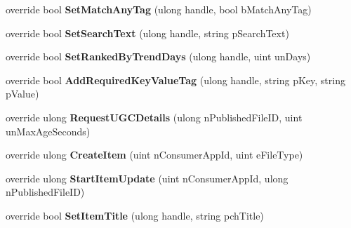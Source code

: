 \begin{DoxyCompactItemize}
override bool {\bfseries Set\+Match\+Any\+Tag} (ulong handle, bool b\+Match\+Any\+Tag)
\item 
\mbox{\label{class_valve_1_1_steamworks_1_1_c_steam_u_g_c_a9e24742b117a556da4d339145d34fea7}} 
override bool {\bfseries Set\+Search\+Text} (ulong handle, string p\+Search\+Text)
\item 
\mbox{\label{class_valve_1_1_steamworks_1_1_c_steam_u_g_c_ae2de4b6798d2b635130b4092e193e91d}} 
override bool {\bfseries Set\+Ranked\+By\+Trend\+Days} (ulong handle, uint un\+Days)
\item 
\mbox{\label{class_valve_1_1_steamworks_1_1_c_steam_u_g_c_ab264e7b336dd432c50d051a054842634}} 
override bool {\bfseries Add\+Required\+Key\+Value\+Tag} (ulong handle, string p\+Key, string p\+Value)
\item 
\mbox{\label{class_valve_1_1_steamworks_1_1_c_steam_u_g_c_a82c63eea1468dc5e8d970244c31c9d2f}} 
override ulong {\bfseries Request\+U\+G\+C\+Details} (ulong n\+Published\+File\+ID, uint un\+Max\+Age\+Seconds)
\item 
\mbox{\label{class_valve_1_1_steamworks_1_1_c_steam_u_g_c_aad823d6de978f22cc6b99c82e01c3b88}} 
override ulong {\bfseries Create\+Item} (uint n\+Consumer\+App\+Id, uint e\+File\+Type)
\item 
\mbox{\label{class_valve_1_1_steamworks_1_1_c_steam_u_g_c_ab68ae06424a0f5e4f562e7a072110d2f}} 
override ulong {\bfseries Start\+Item\+Update} (uint n\+Consumer\+App\+Id, ulong n\+Published\+File\+ID)
\item 
\mbox{\label{class_valve_1_1_steamworks_1_1_c_steam_u_g_c_a7539e045eb5b415778d20ea02ee8e8eb}} 
override bool {\bfseries Set\+Item\+Title} (ulong handle, string pch\+Title)
\item 
\mbox{\label{class_valve_1_1_steamworks_1_1_c_steam_u_g_c_a6d51df1d9a7667c3d4682bdd52db46b7}} 

\end{DoxyCompactItemize}
